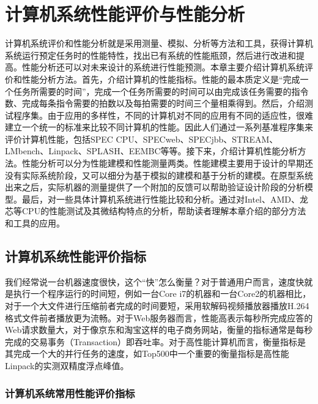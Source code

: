 \documentclass[]{ctexbook}
\begin{document}
\newpage

\hypertarget{ux8ba1ux7b97ux673aux7cfbux7edfux6027ux80fdux8bc4ux4ef7ux4e0eux6027ux80fdux5206ux6790}{%
\chapter{计算机系统性能评价与性能分析}\label{ux8ba1ux7b97ux673aux7cfbux7edfux6027ux80fdux8bc4ux4ef7ux4e0eux6027ux80fdux5206ux6790}}

计算机系统评价和性能分析就是采用测量、模拟、分析等方法和工具，获得计算机系统运行预定任务时的性能特性，找出已有系统的性能瓶颈，然后进行改进和提高。性能分析还可以对未来设计的系统进行性能预测。本章主要介绍计算机系统评价和性能分析方法。首先，介绍计算机的性能指标。性能的最本质定义是``完成一个任务所需要的时间''，完成一个任务所需要的时间可以由完成该任务需要的指令数、完成每条指令需要的拍数以及每拍需要的时间三个量相乘得到。然后，介绍测试程序集。由于应用的多样性，不同的计算机对不同的应用有不同的适应性，很难建立一个统一的标准来比较不同计算机的性能。因此人们通过一系列基准程序集来评价计算机性能，包括SPEC CPU、SPECweb、SPECjbb、STREAM、LMbench、Linpack、SPLASH、EEMBC等等。接下来，介绍计算机性能分析方法。性能分析可以分为性能建模和性能测量两类。性能建模主要用于设计的早期还没有实际系统阶段，又可以细分为基于模拟的建模和基于分析的建模。在原型系统出来之后，实际机器的测量提供了一个附加的反馈可以帮助验证设计阶段的分析模型。最后，对一些具体计算机系统进行性能比较和分析。通过对Intel、AMD、龙芯等CPU的性能测试及其微结构特点的分析，帮助读者理解本章介绍的部分方法和工具的应用。

\hypertarget{ux8ba1ux7b97ux673aux7cfbux7edfux6027ux80fdux8bc4ux4ef7ux6307ux6807}{%
\section{计算机系统性能评价指标}\label{ux8ba1ux7b97ux673aux7cfbux7edfux6027ux80fdux8bc4ux4ef7ux6307ux6807}}

我们经常说一台机器速度很快，这个``快''怎么衡量？对于普通用户而言，速度快就是执行一个程序运行的时间短，例如一台Core i7的机器和一台Core2的机器相比，对于一个大文件进行压缩前者完成的时间要短，采用软解码视频播放器播放H.264格式文件前者播放更为流畅。对于Web服务器而言，性能高表示每秒所完成应答的Web请求数量大，对于像京东和淘宝这样的电子商务网站，衡量的指标通常是每秒完成的交易事务（Transaction）即吞吐率。对于高性能计算机而言，衡量指标是其完成一个大的并行任务的速度，如Top500中一个重要的衡量指标是高性能Linpack的实测双精度浮点峰值。

\hypertarget{ux8ba1ux7b97ux673aux7cfbux7edfux5e38ux7528ux6027ux80fdux8bc4ux4ef7ux6307ux6807}{%
\subsection{计算机系统常用性能评价指标}\label{ux8ba1ux7b97ux673aux7cfbux7edfux5e38ux7528ux6027ux80fdux8bc4ux4ef7ux6307ux6807}}
\end{document}
